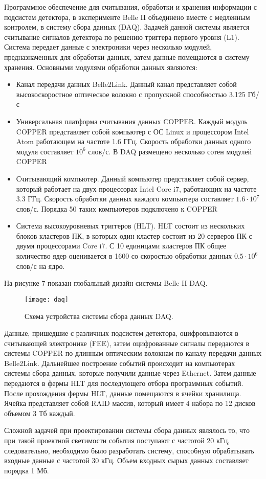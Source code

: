 Программное обеспечение для считывания, обработки и хранения информации с подсистем детектора, в эксперименте Belle II объединено вместе с медленным контролем, в систему сбора данных (DAQ). Задачей данной системы является считывание сигналов детектора по решению триггера первого уровня (L1). Система передает данные с электроники через несколько модулей, предназначенных для обработки данных, затем данные помещаются в систему хранения. Основными модулями обработки данных являются\cite{TechRep}:
\begin{itemize}
  \item Канал передачи данных Belle2Link. Данный канал представляет собой высокоскоростное оптическое волокно с пропускной способностью 3.125 Гб/с
  \item Универсальная платформа считывания данных COPPER. Каждый модуль COPPER представляет собой компьютер с ОС Linux и процессором Intel Atom работающем на частоте 1.6 ГГц. Скорость обработки данных одного модуля составляет $10^6$ слов/с. В DAQ размещено несколько сотен модулей COPPER
  \item Считывающий компьютер. Данный компьютер представляет собой сервер, который  работает на двух процессорах Intel Core i7, работающих на частоте 3.3 ГГц. Скорость обработки данных каждого компьютера составляет $1.6\cdot10^7$ слов/с. Порядка 50 таких компьютеров подключено к COPPER
  \item Система высокоуровневых триггеров (HLT). HLT состоит из нескольких блоков кластеров ПК, в которых один кластер состоит из 20 серверов ПК с двумя процессорами Core i7. С 10 единицами кластеров ПК общее количество ядер оценивается в 1600 со скоростью обработки данных $0.5\cdot10^6$ слов/с на ядро.
\end{itemize}
На рисунке 7 показан глобальный дизайн системы Belle II DAQ. 
\begin{figure}[htp]
  \centering
  \texttt{[image: daq]}
  \caption{Схема устройства системы сбора данных DAQ.}
  \label{fig:galaxy}
\end{figure}
Данные, пришедшие с различных подсистем детектора, оцифровываются в считывающей электронике (FEE), затем оцифрованные сигналы передаются в системы COPPER по длинным оптическим волокнам по каналу передачи данных Belle2Link. Дальнейшее построение событий происходит на компьютерах системы сбора данных, которые получили данные через Ethernet. Затем данные передаются в фермы HLT для последующего отбора программных событий. После прохождения фермы HLT, данные помещаются в ячейки хранилища. Ячейка представляет собой RAID массив, который  имеет 4 набора по 12 дисков объемом 3 Тб каждый\cite{DAQ}.\par
  Сложной задачей при проектировании системы сбора данных являлось то, что при такой проектной светимости события поступают с частотой 20 кГц, следовательно, необходимо было разработать систему, способную обрабатывать входные данные с частотой 30 кГц. Объем входных сырых данных составляет порядка 1 Мб.
